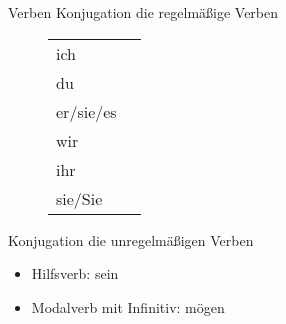 \begin{syntax}{Verben}{}
Konjugation die regelmäßige Verben
\begin{figure}[H]
\centering
\begin{tabular}{ll}
	ich & \ws{e} \\
	du & \ws{st} \\
	er/sie/es & \ws{t} \\
	wir & \ws{en} \\
	ihr & \ws{t} \\
	sie/Sie & \ws{en}
\end{tabular}
\end{figure}

Konjugation die unregelmäßigen Verben
\begin{itemize}
	\item Hilfsverb: sein
	\item Modalverb mit Infinitiv: mögen
\end{itemize}
\end{syntax}

